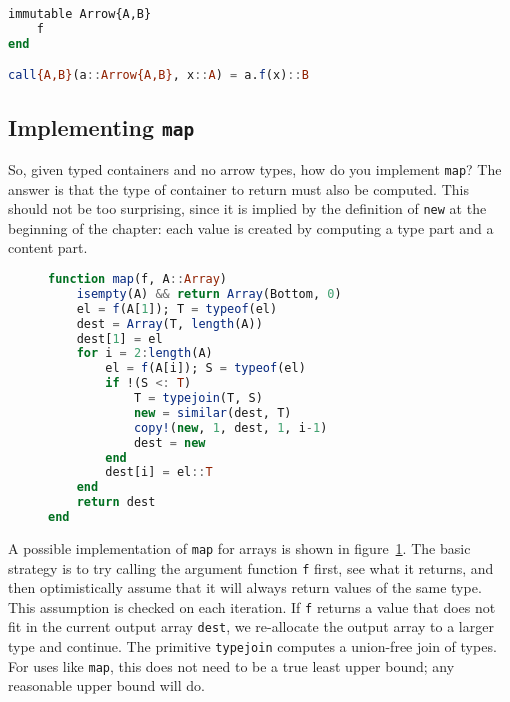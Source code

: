 \begin{singlespace}
\begin{lstlisting}[language=julia]
immutable Arrow{A,B}
    f
end

call{A,B}(a::Arrow{A,B}, x::A) = a.f(x)::B
\end{lstlisting}
\end{singlespace}





\subsection{Implementing \texttt{map}}

So, given typed containers and no arrow types, how do you implement
\texttt{map}? The answer is that the type of container to return must
also be computed. This should not be too surprising, since it is implied by
the definition of \texttt{new} at the beginning of the chapter: each
value is created by computing a type part and a content part.

\begin{singlespace}
\begin{figure}
\begin{lstlisting}[language=julia]
function map(f, A::Array)
    isempty(A) && return Array(Bottom, 0)
    el = f(A[1]); T = typeof(el)
    dest = Array(T, length(A))
    dest[1] = el
    for i = 2:length(A)
        el = f(A[i]); S = typeof(el)
        if !(S <: T)
            T = typejoin(T, S)
            new = similar(dest, T)
            copy!(new, 1, dest, 1, i-1)
            dest = new
        end
        dest[i] = el::T
    end
    return dest
end
\end{lstlisting}
  \caption{
  }
  \label{fig:mapimpl}
\end{figure}
\end{singlespace}

A possible implementation of \texttt{map} for arrays is shown in
figure~\ref{fig:mapimpl}.
The basic strategy is to try calling the argument function \texttt{f}
first, see what it returns, and then optimistically assume that it
will always return values of the same type.
This assumption is checked on each iteration.
If \texttt{f} returns a value that does not fit in the current output
array \texttt{dest}, we re-allocate the output array to a larger
type and continue.
The primitive \texttt{typejoin} computes a union-free join of types.
For uses like \texttt{map}, this does not need to be a true least
upper bound; any reasonable upper bound will do.

